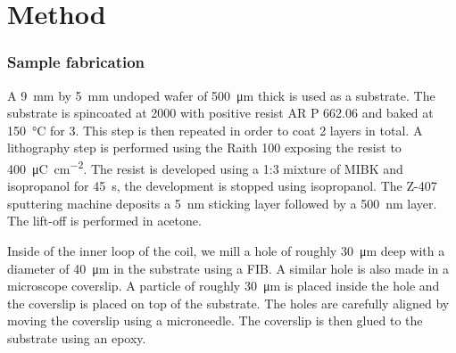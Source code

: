 \chapter{Method}
\label{chap:method}

\subsection{Sample fabrication}
A \qty{9}{\mm} by \qty{5}{\mm} undoped  wafer of \qty{500}{\um} thick is used as a substrate. The substrate is spincoated at \qty{2000}{\rpm} with positive resist AR P 662.06 and baked at \qty{150}{\celsius} for \qty{3}{\min}. This step is then repeated in order to coat 2 layers in total. A lithography step is performed using the Raith 100 exposing the resist to \qty{400}{\micro\coulomb\per\square\cm}. The resist is developed using a 1:3 mixture of MIBK and isopropanol for \qty{45}{\s}, the development is stopped using isopropanol. The Z-407 sputtering machine deposits a \qty{5}{\nm}  sticking layer followed by a \qty{500}{\nm}  layer. The lift-off is performed in acetone.

Inside of the inner loop of the coil, we mill a hole of roughly \qty{30}{\um} deep with a diameter of \qty{40}{\um} in the  substrate using a  FIB. A similar hole is also made in a microscope coverslip. A  particle of roughly \qty{30}{\um} is placed inside the  hole and the coverslip is placed on top of the  substrate. The holes are carefully aligned by moving the coverslip using a microneedle. The coverslip is then glued to the  substrate using an epoxy.
